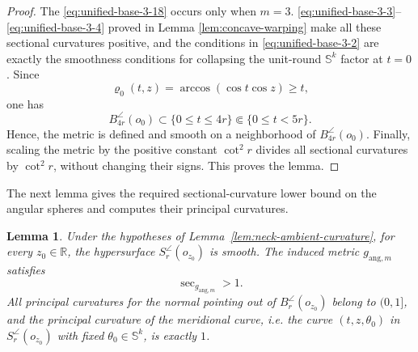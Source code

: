 \documentclass[11pt,reqno]{amsart}
\newtheorem{lemma}[theorem]{Lemma}
\theoremstyle{definition}
\numberwithin{equation}{section}
\begin{document}
\begin{proof}
The \eqref{eq:unified-base-3-18} occurs only when $m=3$.  
\eqref{eq:unified-base-3-3}--\eqref{eq:unified-base-3-4} proved in Lemma \ref{lem:concave-warping} make all these sectional curvatures positive, and
the conditions in \eqref{eq:unified-base-3-2} are exactly the smoothness conditions
for collapsing the unit-round $\mathbb S^k$ factor at $t=0$.
Since
\[
 \varrho_0(t,z)=\arccos(\cos t\cos z)\geq t,
\]
one has
\[
 B_{4r}^{\angle}(o_0)\subset\{0\leq t\leq4r\}
 \Subset\{0\leq t<5r\}.
\]
Hence, the metric is defined and smooth on a neighborhood of $B_{4r}^{\angle}(o_0)$.
Finally, scaling the metric by the positive constant \(\cot^2r\)
divides all sectional curvatures by \(\cot^2r\), without changing their
signs.  This proves the lemma.
\end{proof}
The next lemma gives the required sectional-curvature lower bound on
the angular spheres and computes their principal curvatures.
\begin{lemma}
\label{lem:angular-sphere-geometry}
Under the hypotheses of Lemma~\ref{lem:neck-ambient-curvature}, for
every \(z_0\in\mathbb R\), the hypersurface
\(S_r^{\angle}(o_{z_0})\) is smooth. The induced metric
\(g_{\mathrm{ang},m}\) satisfies
\[
                         \sec_{g_{\mathrm{ang},m}}>1 .
\]
All principal curvatures for the normal pointing out of
\(B_r^{\angle}(o_{z_0})\) belong to \((0,1]\), and the principal curvature of the meridional curve, i.e. the curve $(t, z, \theta_0)$ in $S_r^{\angle}(o_{z_0})$ with fixed $\theta_0\in \mathbb S^k$, is exactly \(1\).
\end{lemma}
\end{document}
